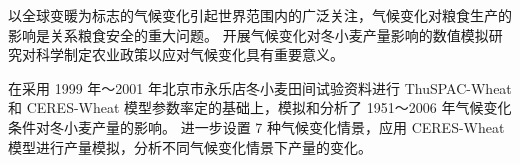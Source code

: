 \documentclass[degree=bachelor]{thuthesis}
\begin{document}
\START
\showoutput


\begin{cabstract}
  以全球变暖为标志的气候变化引起世界范围内的广泛关注，气候变化对粮食生产的影响是关系粮食安全的重大问题。
  开展气候变化对冬小麦产量影响的数值模拟研究对科学制定农业政策以应对气候变化具有重要意义。

  在采用 1999 年～2001 年北京市永乐店冬小麦田间试验资料进行 ThuSPAC-Wheat 和 CERES-Wheat 模型参数率定的基础上，模拟和分析了 1951～2006 年气候变化条件对冬小麦产量的影响。
  进一步设置 7 种气候变化情景，应用 CERES-Wheat 模型进行产量模拟，分析不同气候变化情景下产量的变化。
\end{cabstract}

\makeatletter
\thu@makeabstract@zh

\clearpage
\OMIT
\end{document}
